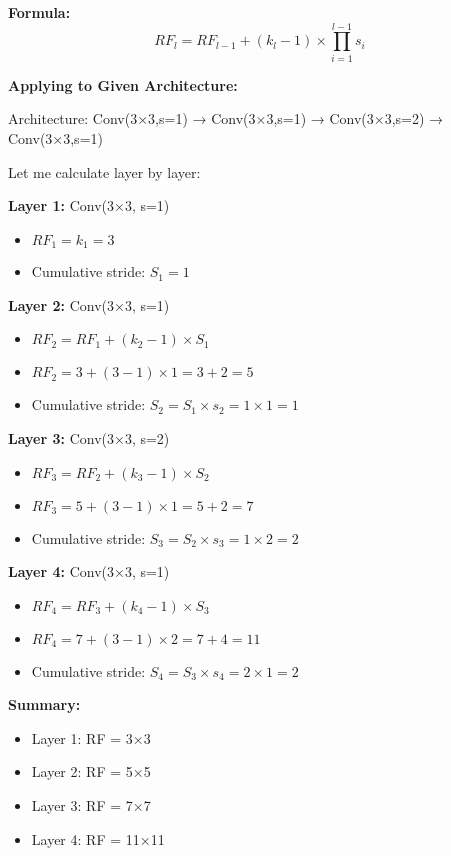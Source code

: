 \documentclass[12pt]{article}
\newcommand{\explanation}[1]{{\color{explanationcolor}#1}}
\begin{document}
\begin{enumerate}[(a)]
{{    \textbf{Formula:}
    \[\boxed{RF_l = RF_{l-1} + (k_l - 1) \times \prod_{i=1}^{l-1} s_i}\]
    }
    
    \textbf{Applying to Given Architecture:}
    
    \explanation{
    Architecture: Conv(3×3,s=1) → Conv(3×3,s=1) → Conv(3×3,s=2) → Conv(3×3,s=1)
    
    Let me calculate layer by layer:
    
    \textbf{Layer 1:} Conv(3×3, s=1)
    \begin{itemize}
        \item $RF_1 = k_1 = 3$
        \item Cumulative stride: $S_1 = 1$
    \end{itemize}
    
    \textbf{Layer 2:} Conv(3×3, s=1)
    \begin{itemize}
        \item $RF_2 = RF_1 + (k_2 - 1) \times S_1$
        \item $RF_2 = 3 + (3 - 1) \times 1 = 3 + 2 = 5$
        \item Cumulative stride: $S_2 = S_1 \times s_2 = 1 \times 1 = 1$
    \end{itemize}
    
    \textbf{Layer 3:} Conv(3×3, s=2)
    \begin{itemize}
        \item $RF_3 = RF_2 + (k_3 - 1) \times S_2$
        \item $RF_3 = 5 + (3 - 1) \times 1 = 5 + 2 = 7$
        \item Cumulative stride: $S_3 = S_2 \times s_3 = 1 \times 2 = 2$
    \end{itemize}
    
    \textbf{Layer 4:} Conv(3×3, s=1)
    \begin{itemize}
        \item $RF_4 = RF_3 + (k_4 - 1) \times S_3$
        \item $RF_4 = 7 + (3 - 1) \times 2 = 7 + 4 = 11$
        \item Cumulative stride: $S_4 = S_3 \times s_4 = 2 \times 1 = 2$
    \end{itemize}
    
    \textbf{Summary:}
    \begin{itemize}
        \item Layer 1: RF = 3×3
        \item Layer 2: RF = 5×5
        \item Layer 3: RF = 7×7
        \item Layer 4: RF = 11×11
    \end{itemize}
    }
    
}
\end{enumerate}
\end{document}
